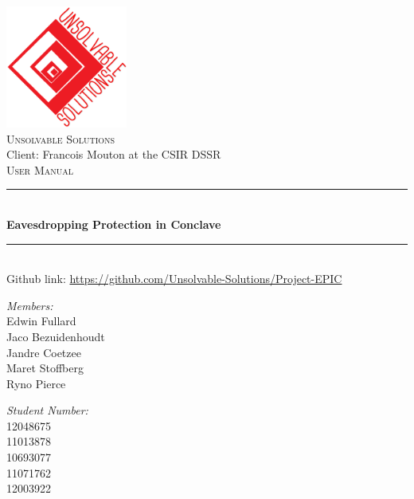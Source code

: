 \newcommand{\HRule}{\rule{\linewidth}{0.5mm}}
\begin{titlepage}
\begin{center}
\includegraphics[width = 0.3\textwidth]{US_logo.png}~\\[1cm]
\textsc{\LARGE Unsolvable Solutions}\\
Client: Francois Mouton at the CSIR DSSR\\[1.5cm]
\textsc{\Large  User Manual}\\[0.5cm]

 \HRule\\[0.4cm]
{ \huge \bfseries  Eavesdropping Protection in Conclave \\[0.4cm] }

 \HRule\\ 



Github link:  \url{https://github.com/Unsolvable-Solutions/Project-EPIC} \\[1.2cm]

\noindent
\begin{minipage}[t]{0.4\textwidth}

	\begin{flushleft} \large
	\emph{Members:}\\
		Edwin Fullard  \\
		Jaco Bezuidenhoudt \\
		Jandre Coetzee\\
		Maret Stoffberg\\
		Ryno Pierce\\
	\end{flushleft}
\end{minipage}%
\begin{minipage}[t]{0.4\textwidth}
\begin{flushright} \large
	\emph{Student Number:} \\
		12048675 \\
		11013878 \\
		 10693077 \\
		 11071762 \\
		 12003922\\
	\end{flushright}
\end{minipage}

\vfill






\end{center}
\end{titlepage}

